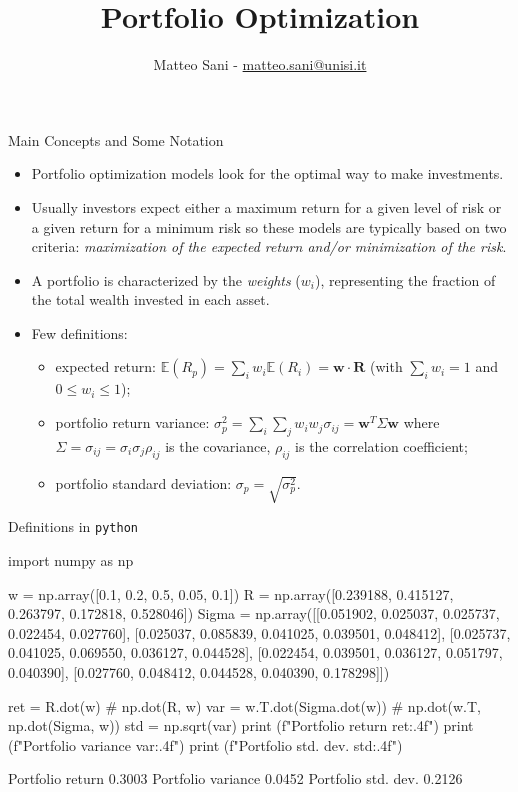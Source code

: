 \documentclass{beamer}
\title{Portfolio Optimization}
\author{Matteo Sani - \href{mailto:matteo.sani@unisi.it}{matteo.sani@unisi.it}}
\begin{document}
\begin{frame}[plain]
	\maketitle
\end{frame}

\begin{frame}{Main Concepts and Some Notation}
  \begin{itemize}
  \item Portfolio optimization models look for the optimal way to make investments. 
  \item Usually investors expect either a maximum return for a given level of risk or a given return for a minimum risk so these models are typically based on two criteria: \emph{maximization of the expected return and/or minimization of the risk}.
  \item A portfolio is characterized by the \emph{weights} ($w_i$), representing the fraction of the total wealth invested in each asset.
  \item Few definitions:
    \begin{itemize}
    \item expected return: $\mathbb{E}(R_{p}) = \sum _{i}w_{i} \mathbb{E}(R_{i}) = \mathbf{w}\cdot \mathbf{R}$ (with $\sum_{i}w_i = 1$ and $0 \le w_i \le 1$);
    \item portfolio return variance: $ \sigma _{p}^{2} = \sum _{i}\sum _{j}w_{i}w_{j}\sigma _{ij} = \mathbf{w}^T\Sigma\mathbf{w}$ where $\Sigma = \sigma _{ij}=\sigma _{i}\sigma _{j}\rho _{ij}$ is the covariance, $\rho_{ij}$ is the correlation coefficient;
    \item portfolio standard deviation: $ \sigma _{p}= \sqrt{\sigma _{p}^{2}}$.
    \end{itemize}
  \end{itemize}
\end{frame}

\begin{frame}[fragile]{Definitions in \texttt{python}}
\begin{ipython}
import numpy as np

w = np.array([0.1, 0.2, 0.5, 0.05, 0.1])
R = np.array([0.239188, 0.415127, 0.263797, 0.172818, 0.528046])
Sigma = np.array([[0.051902, 0.025037, 0.025737, 0.022454, 0.027760],
                  [0.025037, 0.085839, 0.041025, 0.039501, 0.048412],
                  [0.025737, 0.041025, 0.069550, 0.036127, 0.044528],
                  [0.022454, 0.039501, 0.036127, 0.051797, 0.040390],
                  [0.027760, 0.048412, 0.044528, 0.040390, 0.178298]])

ret = R.dot(w) # np.dot(R, w)
var = w.T.dot(Sigma.dot(w)) # np.dot(w.T, np.dot(Sigma, w))
std = np.sqrt(var)
print (f"Portfolio return {ret:.4f}")
print (f"Portfolio variance {var:.4f}")
print (f"Portfolio std. dev. {std:.4f}")
\end{ipython}
\begin{ioutput}
Portfolio return 0.3003
Portfolio variance 0.0452
Portfolio std. dev. 0.2126
\end{ioutput}
\end{frame}
\end{document}
